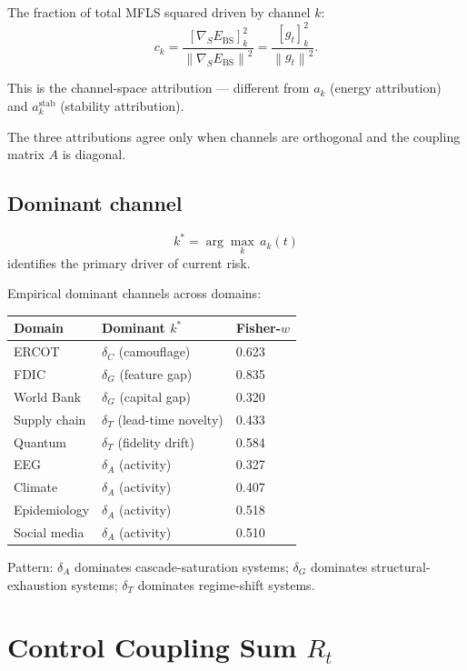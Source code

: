 \documentclass[11pt,a4paper]{article}
\theoremstyle{definition}
\newcommand{\norm}[1]{\left\|#1\right\|}
\begin{document}
The fraction of total MFLS squared driven by channel $k$:
\[
c_k = \frac{[\nabla_S E_\mathrm{BS}]_k^2}{\norm{\nabla_S E_\mathrm{BS}}^2} = \frac{[g_t]_k^2}{\norm{g_t}^2}.
\]

This is the channel-space attribution — different from $a_k$ (energy attribution)
and $a_k^\mathrm{stab}$ (stability attribution).

The three attributions agree only when channels are orthogonal and the
coupling matrix $A$ is diagonal.

\subsection{Dominant channel}

\[
k^* = \arg\max_k\, a_k(t)
\]
identifies the primary driver of current risk.

Empirical dominant channels across domains:
\begin{center}
\begin{tabular}{lll}
\toprule
Domain & Dominant $k^*$ & Fisher-$w$ \\
\midrule
ERCOT & $\delta_C$ (camouflage) & 0.623 \\
FDIC & $\delta_G$ (feature gap) & 0.835 \\
World Bank & $\delta_G$ (capital gap) & 0.320 \\
Supply chain & $\delta_T$ (lead-time novelty) & 0.433 \\
Quantum & $\delta_T$ (fidelity drift) & 0.584 \\
EEG & $\delta_A$ (activity) & 0.327 \\
Climate & $\delta_A$ (activity) & 0.407 \\
Epidemiology & $\delta_A$ (activity) & 0.518 \\
Social media & $\delta_A$ (activity) & 0.510 \\
\bottomrule
\end{tabular}
\end{center}

Pattern: $\delta_A$ dominates cascade-saturation systems;
$\delta_G$ dominates structural-exhaustion systems;
$\delta_T$ dominates regime-shift systems.

\section{Control Coupling Sum $R_t$}
\end{document}
